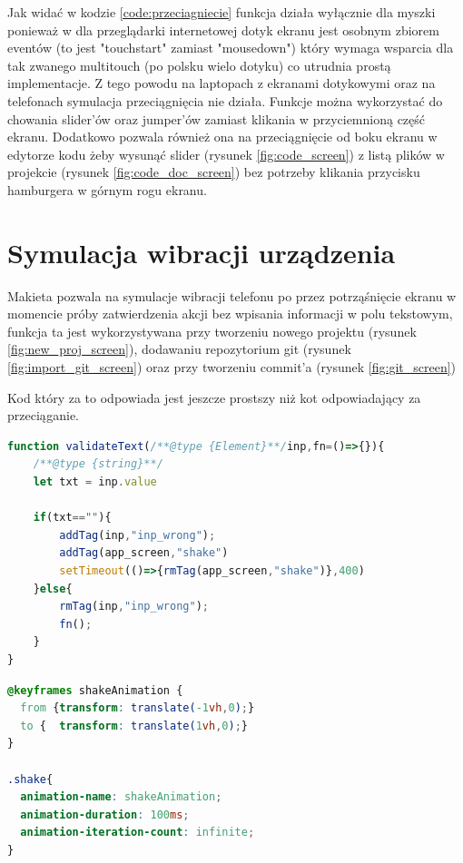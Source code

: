 Jak widać w kodzie \ref{code:przeciagniecie} funkcja działa wyłącznie dla myszki ponieważ w dla przeglądarki internetowej dotyk ekranu jest osobnym zbiorem eventów (to jest "touchstart" zamiast "mousedown") który wymaga wsparcia dla tak zwanego multitouch (po polsku wielo dotyku) co utrudnia prostą implementacje. Z tego powodu na laptopach z ekranami dotykowymi oraz na telefonach symulacja przeciągnięcia nie działa.
\newline\newline
Funkcje można wykorzystać do chowania slider'ów oraz jumper'ów zamiast klikania w przyciemnioną część ekranu. Dodatkowo pozwala również ona na przeciągnięcie od boku ekranu w edytorze kodu żeby wysunąć slider (rysunek \ref{fig:code_screen}) z listą plików w projekcie (rysunek \ref{fig:code_doc_screen}) bez potrzeby klikania przycisku hamburgera w górnym rogu ekranu.



\section{Symulacja wibracji urządzenia}
\label{sec:vibrato}
Makieta pozwala na symulacje wibracji telefonu po przez potrząśnięcie ekranu w momencie próby zatwierdzenia akcji bez wpisania informacji w polu tekstowym, funkcja ta jest wykorzystywana przy tworzeniu nowego projektu (rysunek \ref{fig:new_proj_screen}), dodawaniu repozytorium git (rysunek \ref{fig:import_git_screen}) oraz przy tworzeniu commit'a (rysunek \ref{fig:git_screen})

Kod który za to odpowiada jest jeszcze prostszy niż kot odpowiadający za przeciąganie.

\begin{lstlisting}[language=javascript, caption={Kod odpowiadający za wywoływania wibracji dodawanie czerwonej ramki do pustych pól.}, label={code:shake}]
function validateText(/**@type {Element}**/inp,fn=()=>{}){
    /**@type {string}**/
    let txt = inp.value
    
    if(txt==""){
        addTag(inp,"inp_wrong");
        addTag(app_screen,"shake")
        setTimeout(()=>{rmTag(app_screen,"shake")},400)
    }else{
        rmTag(inp,"inp_wrong");
        fn();
    }
}
\end{lstlisting}

\begin{lstlisting}[language=css, caption={Kod css odpowiadający za trzęsienie.}, label={code:shake-css}]
@keyframes shakeAnimation {
  from {transform: translate(-1vh,0);}
  to {  transform: translate(1vh,0);}
}

.shake{
  animation-name: shakeAnimation;
  animation-duration: 100ms;
  animation-iteration-count: infinite;
}
\end{lstlisting}

